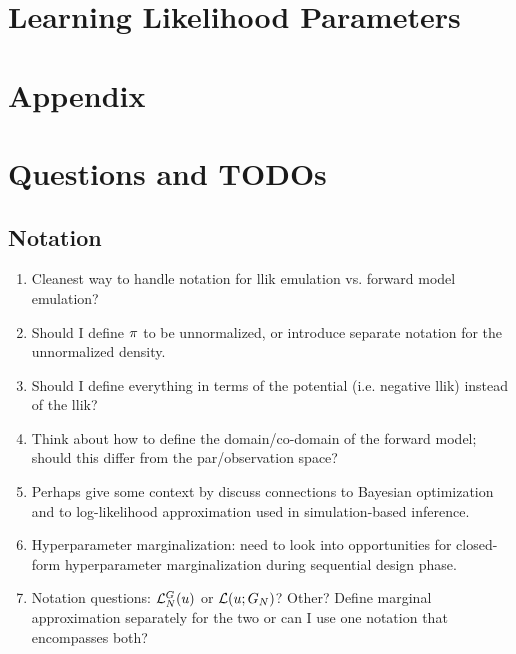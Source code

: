 \documentclass[12pt]{article}
\begin{document}
\section{Learning Likelihood Parameters} \label{section_lik_par}

\section{Appendix}

\section{Questions and TODOs}
\subsection{Notation}
\begin{enumerate}
\item Cleanest way to handle notation for llik emulation vs. forward model emulation? 
\item Should I define $\pi$ to be unnormalized, or introduce separate notation for the unnormalized density. 
\item Should I define everything in terms of the potential (i.e. negative llik) instead of the llik? 
\item Think about how to define the domain/co-domain of the forward model; should this differ from the par/observation space? 
\item Perhaps give some context by discuss connections to Bayesian optimization and to log-likelihood approximation used in 
simulation-based inference. 
\item Hyperparameter marginalization: need to look into opportunities for closed-form hyperparameter marginalization during 
sequential design phase. 
\item Notation questions: $\mathcal{L}^{G}_{N}(u)$ or $\mathcal{L}(u; G_{N})$? Other? Define marginal approximation separately 
for the two or can I use one notation that encompasses both? 
\end{enumerate}



 

\end{document}
